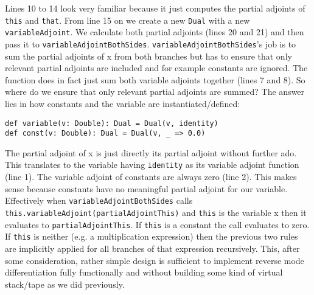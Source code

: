 Lines 10 to 14 look very familiar because it just computes the partial adjoints of \lstinline{this} and \lstinline{that}. From line 15 on we create a new \lstinline{Dual} with a new \lstinline{variableAdjoint}.  We calculate both partial adjoints (lines 20 and 21) and then pass it to \lstinline{variableAdjointBothSides}. \lstinline{variableAdjointBothSides}'s job is to sum the partial adjoints of x from both branches but has to ensure that only relevant partial adjoints are included and for example constants are ignored. The function does in fact just sum both variable adjoints together (lines 7 and 8). So where do we ensure that only relevant partial adjoints are summed? The answer lies in how constants and the variable are instantiated/defined:
\begin{lstlisting}
def variable(v: Double): Dual = Dual(v, identity)
def const(v: Double): Dual = Dual(v, _ => 0.0)
\end{lstlisting}
The partial adjoint of x is just directly its partial adjoint without further ado. This translates to the variable having \lstinline{identity} as its variable adjoint function (line 1). The variable adjoint of constants are always zero (line 2). This makes sense because constants have no meaningful partial adjoint for our variable. Effectively when \lstinline{variableAdjointBothSides} calls \lstinline{this.variableAdjoint(partialAdjointThis)} and \lstinline{this} is the variable x then it evaluates to \lstinline{partialAdjointThis}. If \lstinline{this} is a constant the call evaluates to zero. If \lstinline{this} is neither (e.g. a multiplication expression) then the previous two rules are implicitly applied for all branches of that expression recursively. This, after some consideration, rather simple design is sufficient to implement reverse mode differentiation fully functionally and without building some kind of virtual stack/tape as we did previously.

